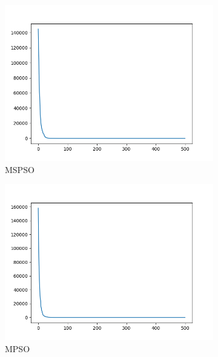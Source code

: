 \documentclass[12pt]{article}
\begin{document}
\begin{figure}[H]
    \centering
    \begin{subfigure}{0.32\textwidth}
        \centering
        \includegraphics[width=\linewidth]{plots/MSPSO/corana.png}
        \caption{MSPSO}
    \end{subfigure}
    \begin{subfigure}{0.32\textwidth}
        \centering
        \includegraphics[width=\linewidth]{plots/MPSO/corana.png}
        \caption{MPSO}
    \end{subfigure}
    \begin{subfigure}{0.32\textwidth}
        \centering

\end{subfigure}
\end{figure}
\end{document}
